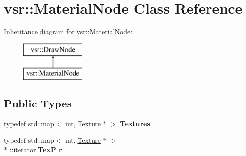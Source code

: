 \hypertarget{classvsr_1_1_material_node}{\section{vsr\-:\-:Material\-Node Class Reference}
\label{classvsr_1_1_material_node}
}
Inheritance diagram for vsr\-:\-:Material\-Node\-:\begin{figure}[H]
\begin{center}
\leavevmode
\includegraphics[height=2.000000cm]{classvsr_1_1_material_node}
\end{center}
\end{figure}
\subsection*{Public Types}
\begin{DoxyCompactItemize}
\item 
\hypertarget{classvsr_1_1_material_node_a7efcdd77272a557e2561193733fee1cd}{typedef std\-::map$<$ int, \hyperlink{classvsr_1_1_texture}{Texture} $\ast$ $>$ {\bfseries Textures}}\label{classvsr_1_1_material_node_a7efcdd77272a557e2561193733fee1cd}

\item 
\hypertarget{classvsr_1_1_material_node_a1642781f74f55910e07368b9c9e861c6}{typedef std\-::map$<$ int, \hyperlink{classvsr_1_1_texture}{Texture} $\ast$ $>$\\*
\-::iterator {\bfseries Tex\-Ptr}}\label{classvsr_1_1_material_node_a1642781f74f55910e07368b9c9e861c6}

\end{DoxyCompactItemize}

